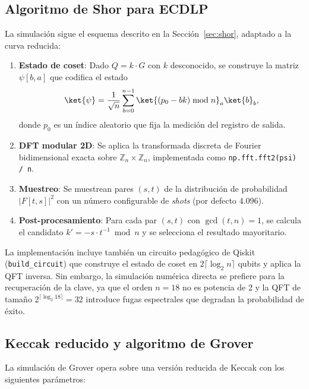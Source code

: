 \subsection{Algoritmo de Shor para ECDLP}

La simulación sigue el esquema descrito en la Sección~\ref{sec:shor}, adaptado a la curva reducida:

\begin{enumerate}
  \item \textbf{Estado de coset}: Dado $Q = k \cdot G$ con $k$ desconocido, se construye la matriz $\psi[b, a]$ que codifica el estado
  \begin{equation}
    \ket{\psi} = \frac{1}{\sqrt{n}} \sum_{b=0}^{n-1} \ket{(p_0 - bk) \bmod n}_a \ket{b}_b,
  \end{equation}
  donde $p_0$ es un índice aleatorio que fija la medición del registro de salida.
  
  \item \textbf{DFT modular 2D}: Se aplica la transformada discreta de Fourier bidimensional exacta sobre $\mathbb{Z}_n \times \mathbb{Z}_n$, implementada como \texttt{np.fft.fft2(psi) / n}.
  
  \item \textbf{Muestreo}: Se muestrean pares $(s, t)$ de la distribución de probabilidad $|F[t, s]|^2$ con un número configurable de \emph{shots} (por defecto 4.096).
  
  \item \textbf{Post-procesamiento}: Para cada par $(s, t)$ con $\gcd(t, n) = 1$, se calcula el candidato $k' = -s \cdot t^{-1} \bmod n$ y se selecciona el resultado mayoritario.
\end{enumerate}

La implementación incluye también un circuito pedagógico de Qiskit (\texttt{build\_circuit}) que construye el estado de coset en $2 \lceil \log_2 n \rceil$ qubits y aplica la QFT inversa. Sin embargo, la simulación numérica directa se prefiere para la recuperación de la clave, ya que el orden $n = 18$ no es potencia de 2 y la QFT de tamaño $2^{\lceil \log_2 18 \rceil} = 32$ introduce fugas espectrales que degradan la probabilidad de éxito.

\subsection{Keccak reducido y algoritmo de Grover}

La simulación de Grover opera sobre una versión reducida de Keccak con los siguientes parámetros:


